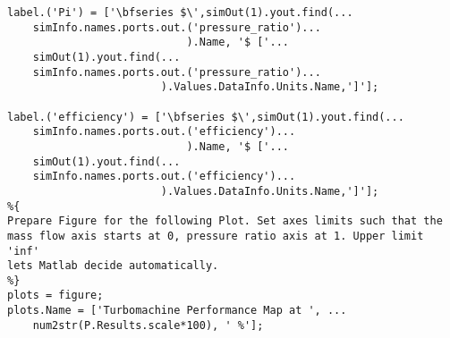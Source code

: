 \begin{lstlisting}
label.('Pi') = ['\bfseries $\',simOut(1).yout.find(...
    simInfo.names.ports.out.('pressure_ratio')...
                            ).Name, '$ ['...
    simOut(1).yout.find(...
    simInfo.names.ports.out.('pressure_ratio')...
                        ).Values.DataInfo.Units.Name,']'];

label.('efficiency') = ['\bfseries $\',simOut(1).yout.find(...
    simInfo.names.ports.out.('efficiency')...
                            ).Name, '$ ['...
    simOut(1).yout.find(...
    simInfo.names.ports.out.('efficiency')...
                        ).Values.DataInfo.Units.Name,']'];
%{
Prepare Figure for the following Plot. Set axes limits such that the
mass flow axis starts at 0, pressure ratio axis at 1. Upper limit 'inf'
lets Matlab decide automatically.
%}
plots = figure;
plots.Name = ['Turbomachine Performance Map at ', ...
    num2str(P.Results.scale*100), ' %'];


\end{lstlisting}
